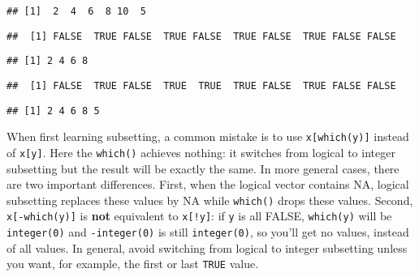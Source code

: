 \begin{verbatim}
## [1]  2  4  6  8 10  5
\end{verbatim}

\begin{Shaded}
\begin{Highlighting}[]
\OperatorTok{&}\StringTok{ }\OperatorTok{!}
\end{Highlighting}
\end{Shaded}

\begin{verbatim}
##  [1] FALSE  TRUE FALSE  TRUE FALSE  TRUE FALSE  TRUE FALSE FALSE
\end{verbatim}

\begin{Shaded}
\begin{Highlighting}[]
\end{Highlighting}
\end{Shaded}

\begin{verbatim}
## [1] 2 4 6 8
\end{verbatim}

\begin{Shaded}
\begin{Highlighting}[]
\end{Highlighting}
\end{Shaded}

\begin{verbatim}
##  [1] FALSE  TRUE FALSE  TRUE  TRUE  TRUE FALSE  TRUE FALSE FALSE
\end{verbatim}

\begin{Shaded}
\begin{Highlighting}[]
\NormalTok{(}
\end{Highlighting}
\end{Shaded}

\begin{verbatim}
## [1] 2 4 6 8 5
\end{verbatim}

When first learning subsetting, a common mistake is to use
\texttt{x{[}which(y){]}} instead of \texttt{x{[}y{]}}. Here the
\texttt{which()} achieves nothing: it switches from logical to integer
subsetting but the result will be exactly the same. In more general
cases, there are two important differences. First, when the logical
vector contains NA, logical subsetting replaces these values by NA while
\texttt{which()} drops these values. Second, \texttt{x{[}-which(y){]}}
is \textbf{not} equivalent to \texttt{x{[}!y{]}}: if \texttt{y} is all
FALSE, \texttt{which(y)} will be \texttt{integer(0)} and
\texttt{-integer(0)} is still \texttt{integer(0)}, so you'll get no
values, instead of all values. In general, avoid switching from logical
to integer subsetting unless you want, for example, the first or last
\texttt{TRUE} value.

